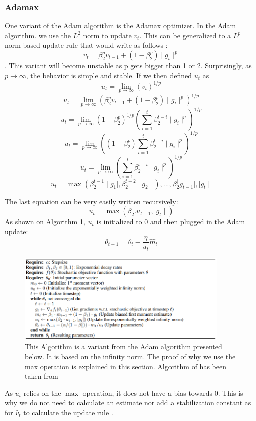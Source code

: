 \subsubsection{Adamax}
One variant of the Adam algorithm is the Adamax optimizer. In the Adam algorithm. we use the \(L^2\) norm to update \(v_t\). This can be generalized to a \(L^p\) norm based update rule that would write as follows : \[ v_t = \beta_2^p v_{t-1} + (1 - \beta_2^p) \mid g_t\mid^p \] . This variant will become unstable as p gets bigger than 1 or 2. Surprisingly, as \(p\to\infty\), the behavior is simple and stable. If we then defined \(u_t\) as \[u_t = \lim_{p\to\infty}(v_t)^{1/p}\]
\[u_t = \lim_{p\to\infty}(\beta_2^p v_{t-1} + (1 - \beta_2^p)\mid g_t\mid^p)^{1/p}\] 
\[u_t = \lim_{p\to\infty}(1 - \beta_2^p)^{1/p}(\sum_{i=1}^{t}\beta_2^{t-i} \mid g_i\mid ^p)^{1/p}\]
\[u_t = \lim_{p\to\infty}((1 - \beta_2^p) \sum_{i=1}^{t}\beta_2^{t-i} \mid g_i\mid ^p)^{1/p}\]
\[u_t = \lim_{p\to\infty}(\sum_{i=1}^{t}\beta_2^{t-i} \mid g_i\mid ^p)^{1/p}\]
\[u_t = \max (\beta_2^{t-1}  \mid g_1\mid, \beta_2^{t-2}  \mid g_2\mid ), ..., \beta_2^ \mid g_{t-1}\mid, \mid g_t\mid\]

The last equation can be very easily written recursively: 
\[ u_t = \max(\beta_2 . u_{t-1},  \mid g_t\mid)\]
As shown on Algorithm \ref{fig:adamax_algo}, \(u_t\) is initialized to 0 and then plugged in the Adam update: 
\[\theta_{t+1} = \theta_t - \frac{\eta}{u_t} \hat{m}_t\]

\begin{figure}[!htp]
    \centering
        \includegraphics[width=0.9\textwidth]{figures/02-adamax_algo}
        \caption[Adamax Algorithm]{ This Algorithm is a variant from the Adam algorithm presented below. It is based on the infinity norm. The proof of why we use the max operation is explained in this section. Algorithm of has been taken from \cite{adam}}\label{fig:adamax_algo}
\end{figure}

As \(u_t\) relies on the \(\max\) operation, it does not have a bias towards 0. This is why we do not need to calculate an estimate nor add a stabilization constant as for \(\hat{v}_t\) to calculate the update rule \cite{adam}.

